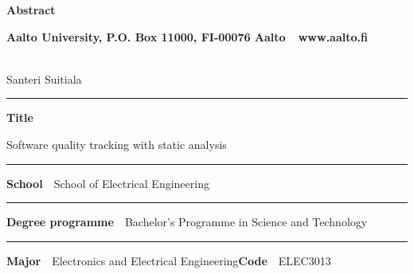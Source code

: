 
\newpage
{}
{}


\begin{spacing}{.88}

{\parindent0pt %

{\fontsize{13.9pt}{13.9pt}\selectfont
\vspace{-8.9mm}\hfill{\bfseries\sffamily\lsstyle Abstract}}

{\fontsize{9.48pt}{9.48pt}\selectfont
\vspace{.9mm}\hfill{\bfseries\sffamily\lsstyle Aalto University, P.O. Box 11000, FI-00076 Aalto~~\textcolor{aaltoGray}{www.aalto.fi}}}

\\
{\small Santeri Suitiala}

\vspace{-2.4mm}\rule{\textwidth}{.75pt}

{\fontsize{10.5pt}{10.5pt}\bfseries\sffamily\lsstyle Title}\\
\parbox[t]{\textwidth}{\raggedright\small Software quality tracking with static analysis}

\vspace{.5mm}\rule{\textwidth}{.75pt}

{\fontsize{10.5pt}{10.5pt}\bfseries\sffamily\lsstyle School}~~{\small School of Electrical Engineering}

\vspace{-2.4mm}\rule{\textwidth}{.75pt}

{\fontsize{10.5pt}{10.5pt}\bfseries\sffamily\lsstyle Degree programme}~~{\small Bachelor’s Programme in Science and Technology}

\vspace{-2.4mm}\rule{\textwidth}{.75pt}

{\fontsize{10.5pt}{10.5pt}\bfseries\sffamily\lsstyle Major}~~{\small Electronics and Electrical Engineering}\hfill{\fontsize{10.5pt}{10.5pt}\bfseries\sffamily\lsstyle Code}~~{\small ELEC3013}

}
\end{spacing}
